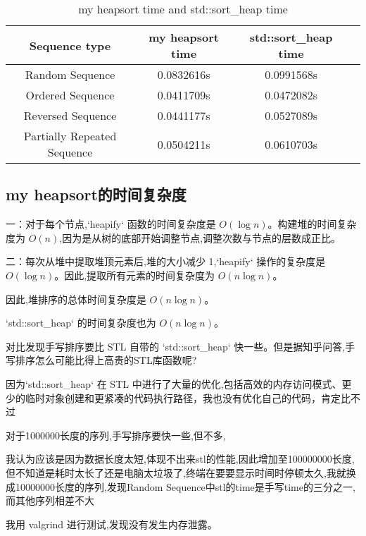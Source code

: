\documentclass[UTF8]{ctexart}
\begin{document}
\begin{table}[ht]
    \centering
    \begin{tabular}{|c|c|c|c|}
    \hline
    \textbf{Sequence type} & \textbf{my heapsort time} & \textbf{std::sort\_heap time}  \\
    \hline
    Random Sequence & 0.0832616s & 0.0991568s  \\
    \hline
    Ordered Sequence & 0.0411709s & 0.0472082s  \\
    \hline
    Reversed Sequence & 0.0441177s & 0.0527089s \\
    \hline
    Partially Repeated Sequence & 0.0504211s & 0.0610703s  \\
    \hline
    \end{tabular}
    \caption{my heapsort time and std::sort\_heap time}
    \label{tab:performance_comparison}
\end{table}

\subsection{my heapsort的时间复杂度}

一：对于每个节点,`heapify` 函数的时间复杂度是 $O(\log n)$。构建堆的时间复杂度为 $O(n)$,因为是从树的底部开始调整节点,调整次数与节点的层数成正比。

二：每次从堆中提取堆顶元素后,堆的大小减少 1,`heapify` 操作的复杂度是 $O(\log n)$。因此,提取所有元素的时间复杂度为 $O(n \log n)$。

因此,堆排序的总体时间复杂度是 $O(n \log n)$。


`std::sort\_heap` 的时间复杂度也为 $O(n \log n)$。

对比发现手写排序要比 STL 自带的 `std::sort\_heap` 快一些。但是据知乎问答,手写排序怎么可能比得上高贵的STL库函数呢?

 因为`std::sort\_heap` 在 STL 中进行了大量的优化,包括高效的内存访问模式、更少的临时对象创建和更紧凑的代码执行路径，我也没有优化自己的代码，肯定比不过

对于1000000长度的序列,手写排序要快一些,但不多,

我认为应该是因为数据长度太短,体现不出来stl的性能,因此增加至100000000长度,但不知道是耗时太长了还是电脑太垃圾了,终端在要要显示时间时停顿太久,我就换成10000000长度的序列,发现Random Sequence中stl的time是手写time的三分之一,而其他序列相差不大



我用 valgrind 进行测试,发现没有发生内存泄露。
\end{document}
